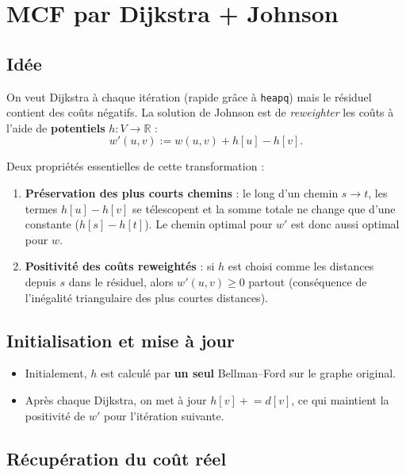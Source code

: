 \documentclass[11pt,a4paper]{article}
\begin{document}
\section{MCF par Dijkstra + Johnson}
\label{sec:mcf-johnson}

\subsection{Idée}

On veut Dijkstra à chaque itération (rapide grâce à \texttt{heapq}) mais
le résiduel contient des coûts négatifs. La solution de Johnson est de
\emph{reweighter} les coûts à l'aide de \textbf{potentiels} $h : V \to \mathbb{R}$ :
\[
    w'(u, v) := w(u, v) + h[u] - h[v].
\]

Deux propriétés essentielles de cette transformation :
\begin{enumerate}
    \item \textbf{Préservation des plus courts chemins} : le long d'un
        chemin $s \to t$, les termes $h[u] - h[v]$ se télescopent et la
        somme totale ne change que d'une constante ($h[s] - h[t]$). Le
        chemin optimal pour $w'$ est donc aussi optimal pour $w$.
    \item \textbf{Positivité des coûts reweightés} : si $h$ est choisi
        comme les distances depuis $s$ dans le résiduel, alors
        $w'(u, v) \ge 0$ partout (conséquence de l'inégalité triangulaire
        des plus courtes distances).
\end{enumerate}

\subsection{Initialisation et mise à jour}

\begin{itemize}
    \item Initialement, $h$ est calculé par \textbf{un seul} Bellman--Ford
        sur le graphe original.
    \item Après chaque Dijkstra, on met à jour $h[v] \mathrel{+}= d[v]$, ce
        qui maintient la positivité de $w'$ pour l'itération suivante.
\end{itemize}

\subsection{Récupération du coût réel}
\end{document}
